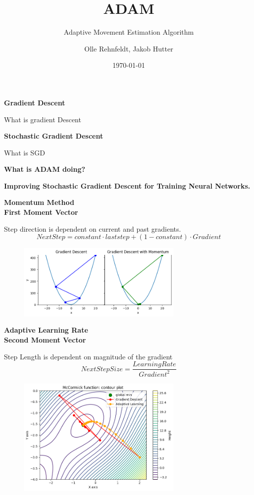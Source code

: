 \documentclass{beamer}
\author{Olle Rehnfeldt, Jakob Hutter}
\title{ADAM}
\subtitle{Adaptive Movement Estimation Algorithm}
\institute{Data Science and Society}
\date{\today}
\newcommand\myheading[1]{%
  \par\bigskip
  {\Large\bfseries#1}\par\smallskip}
\begin{document}
\begin{frame}
    \titlepage
\end{frame}


\begin{frame}
    \myheading{Gradient Descent}
    What is gradient Descent
\end{frame}


\begin{frame}
    \myheading{Stochastic Gradient Descent}
    What is SGD
\end{frame}

\begin{frame}
    \myheading{What is ADAM doing?}
\end{frame}
\begin{frame}
    \myheading{Improving Stochastic Gradient Descent for Training Neural Networks.}
\end{frame}


\begin{frame}
    \myheading{Momentum Method\\First Moment Vector}
    Step direction is dependent on current and past gradients.
    $$Next Step = constant \cdot last step + (1-constant) \cdot Gradient$$
    
    \begin{figure}[h]
        \includegraphics[width=8cm]{report/figures/GD_momentum.png}
    \end{figure}
\end{frame}


\begin{frame}
    \myheading{Adaptive Learning Rate\\Second Moment Vector}
    Step Length is dependent on magnitude of the gradient
    $$NextStepSize = \frac{LearningRate}{Gradient^2} $$
    
    \begin{figure}[h]
        \includegraphics[width=8cm]{report/figures/GD_rmsprop.png}
    \end{figure}
\end{frame}
\end{document}

